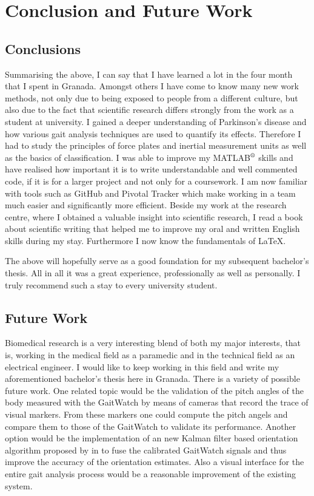 \chapter{Conclusion and Future Work}
\label{ch:Conclusion and Future Work}

\section{Conclusions}

Summarising the above, I can say that I have learned a lot in the four month that I spent in Granada. Amongst others I have come to know many new work methods, not only due to being exposed to people from a different culture, but also due to the fact that scientific research differs strongly from the work as a student at university. I gained a deeper understanding of Parkinson's disease and how various gait analysis techniques are used to quantify its effects. Therefore I had to study the principles of force plates and inertial measurement units as well as the basics of classification. I was able to improve my MATLAB$\textsuperscript{\textregistered}$ skills and have realised how important it is to write understandable and well commented code, if it is for a larger project and not only for a coursework. I am now familiar with tools such as GitHub and Pivotal Tracker which make working in a team much easier and significantly more efficient.  Beside my work at the research centre, where I obtained a valuable insight into scientific research, I read a book about scientific writing that helped me to improve my oral and written English skills during my stay. Furthermore I now know the fundamentals of \LaTeX{}.

The above will hopefully serve as a good foundation for my subsequent bachelor's thesis.  All in all it was a great experience, professionally as well as personally. I truly recommend such a stay to every university student.

\section{Future Work}

Biomedical research is a very interesting blend of both my major interests, that is, working in the medical field as a paramedic and  in the technical field as an electrical engineer. I would like to keep working in this field and write my aforementioned bachelor's thesis here in Granada. There is a variety of possible future work. One related topic would be the validation of the pitch angles of the body measured with the GaitWatch by means of cameras that record the trace of visual markers. From these markers one could compute the pitch angels and compare them to those of the GaitWatch to validate its performance. Another option would be the implementation of an new Kalman filter based orientation algorithm proposed by \citeauthor{bennett_motion_2014} in \cite{bennett_motion_2014} to fuse the calibrated GaitWatch signals and thus improve the accuracy of the orientation estimates. Also a visual interface for the entire gait analysis process would be a reasonable improvement of the existing system.